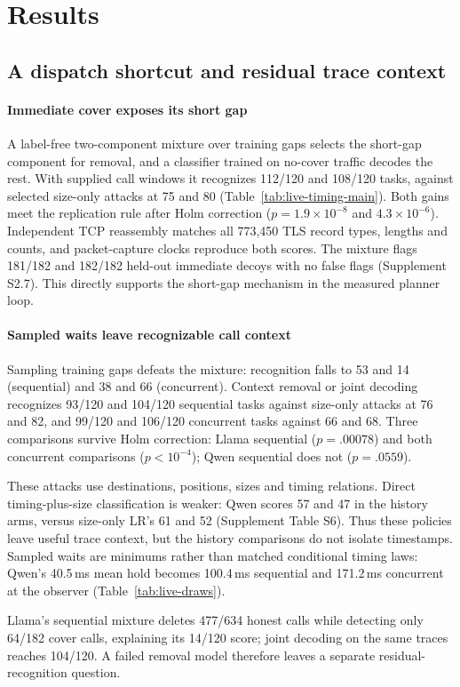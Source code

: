 \section{Results}\label{sec:results}
\subsection{A dispatch shortcut and residual trace context}\label{sec:dispatch}

\paragraph{Immediate cover exposes its short gap}
A label-free two-component mixture over training gaps selects the short-gap component for removal, and a classifier trained on no-cover traffic decodes the rest. With supplied call windows it recognizes 112/120 and 108/120 tasks, against selected size-only attacks at 75 and 80 (Table~\ref{tab:live-timing-main}). Both gains meet the replication rule after Holm correction ($p=1.9\times10^{-8}$ and $4.3\times10^{-6}$). Independent TCP reassembly matches all 773,450 TLS record types, lengths and counts, and packet-capture clocks reproduce both scores. The mixture flags 181/182 and 182/182 held-out immediate decoys with no false flags (Supplement S2.7). This directly supports the short-gap mechanism in the measured planner loop.

\paragraph{Sampled waits leave recognizable call context}
Sampling training gaps defeats the mixture: recognition falls to 53 and 14 (sequential) and 38 and 66 (concurrent). Context removal or joint decoding recognizes 93/120 and 104/120 sequential tasks against size-only attacks at 76 and 82, and 99/120 and 106/120 concurrent tasks against 66 and 68. Three comparisons survive Holm correction: Llama sequential ($p=.00078$) and both concurrent comparisons ($p<10^{-4}$); Qwen sequential does not ($p=.0559$).

These attacks use destinations, positions, sizes and timing relations. Direct timing-plus-size classification is weaker: Qwen scores 57 and 47 in the history arms, versus size-only LR's 61 and 52 (Supplement Table S6). Thus these policies leave useful trace context, but the history comparisons do not isolate timestamps. Sampled waits are minimums rather than matched conditional timing laws: Qwen's 40.5\,ms mean hold becomes 100.4\,ms sequential and 171.2\,ms concurrent at the observer (Table~\ref{tab:live-draws}).

Llama's sequential mixture deletes 477/634 honest calls while detecting only 64/182 cover calls, explaining its 14/120 score; joint decoding on the same traces reaches 104/120. A failed removal model therefore leaves a separate residual-recognition question.

